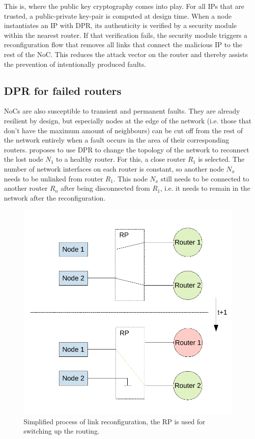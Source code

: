 This is, where the public key cryptography comes into play. 
For all \glspl{IP} that are trusted, a public-private key-pair is computed at design time. 
When a node instantiates an \gls{IP} with \gls{DPR}, its authenticity is verified by a security module within the nearest router. 
If that verification fails, the security module triggers a reconfiguration flow that removes all links that connect the malicious \gls{IP} to the rest of the \gls{NoC}.
This reduces the attack vector on the router and thereby assists the prevention of intentionally produced faults. 

\subsection{\gls{DPR} for failed routers}
\glspl{NoC} are also susceptible to transient and permanent faults. 
They are already resilient by design, but especially nodes at the edge of the network (i.e. those that don't have the maximum amount of neighbours) can be cut off from the rest of the network entirely when a fault occurs in the area of their corresponding routers. 
\cite{wehbe_secure_2016} proposes to use \gls{DPR} to change the topology of the network to reconnect the lost node $N_1$ to a healthy router.
For this, a close router $R_1$ is selected. 
The number of network interfaces on each router is constant, so another node $N_x$ needs to be unlinked from router $R_1$. 
This node $N_x$ still needs to be connected to another router $R_n$ after being disconnected from $R_1$, i.e. it needs to remain in the network after the reconfiguration.
\begin{figure}
    \centering
    \includegraphics[width=\columnwidth]{graphics/nocSwap.pdf}
    \caption{Simplified process of link reconfiguration, the \gls{RP} is used for switching up the routing.}\label{fig:nocSwap}
\end{figure}
